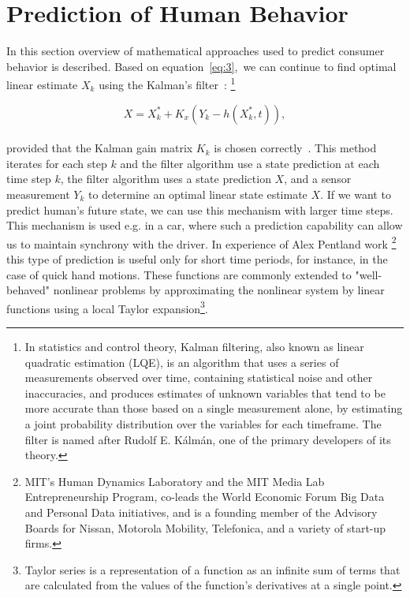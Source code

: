 \section{Prediction of Human Behavior} \label{sec:prediction}
In this section overview of mathematical approaches used to predict consumer behavior is described.
Based on equation~\ref{eq:3},\ we can continue to find optimal linear estimate $X_k$ using the Kalman's filter~\cite{pantland}: \footnote{In statistics
and control theory, Kalman filtering, also known as linear quadratic estimation (LQE), is an algorithm that
uses a series of measurements observed over time, containing statistical noise and other inaccuracies, and produces
estimates of unknown variables that tend to be more accurate than those based on a single measurement alone, by estimating
a joint probability distribution over the variables for each timeframe.
The filter is named after Rudolf E. Kálmán, one of the primary developers of its theory.}

\begin{equation} \label{eq:6}
X = X_{k}^{*} + K_x(Y_k - h(X_{k}^{*},t)),
\end{equation}
\\
provided that the Kalman gain matrix $K_k$ is chosen correctly~\cite{kalman}.
This method iterates for each step $k$ and the filter algorithm use a state prediction at each time step $k$, the filter algorithm
uses a state prediction $X$, and a sensor measurement $Y_k$ to determine an optimal linear state estimate $X$.
If we want to predict human’s future state, we can use this mechanism with larger time steps.
This mechanism is used e.g. in a car, where such a prediction capability can allow us to maintain synchrony with the driver.
In experience of Alex Pentland work \footnote{MIT's Human Dynamics Laboratory and the MIT Media Lab Entrepreneurship
Program, co-leads the World Economic Forum Big Data and Personal Data initiatives, and is a founding member
of the Advisory Boards for Nissan, Motorola Mobility, Telefonica, and a variety of start-up firms.} this type of prediction is useful only for short time periods,
for instance, in the case of quick hand motions.
These functions are commonly extended to "well-behaved" nonlinear problems by approximating
the nonlinear system by linear functions using a local Taylor expansion\footnote{Taylor series is a representation of a function
as an infinite sum of terms that are calculated from the values of the function's derivatives at a single point.}.

